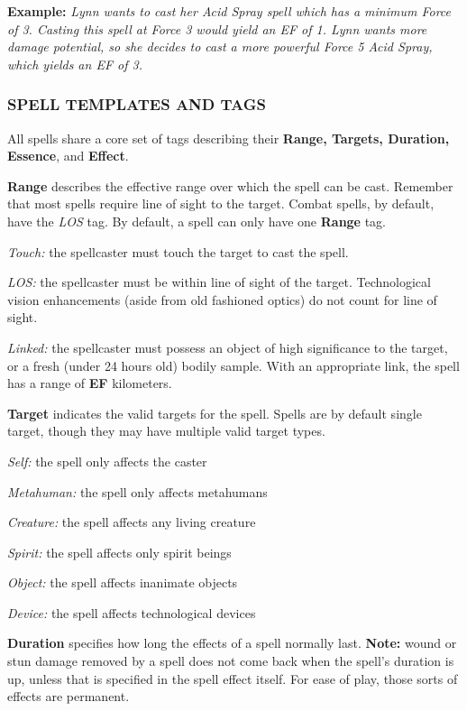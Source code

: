 \documentclass[oneside,10pt]{article}
\begin{document}
\begin{multicols}{2}
\begin{adjustwidth*}{.5cm}{.5cm}
\textbf{Example:} \textit{Lynn wants to cast her Acid Spray spell which has a minimum Force of 3. Casting this spell at Force 3 would yield an EF of 1. Lynn wants more damage potential, so she decides to cast a more powerful Force 5 Acid Spray, which yields an EF of 3.}
\end{adjustwidth*}


\subsubsection{SPELL TEMPLATES AND TAGS}

All spells share a core set of tags describing their \textbf{Range, Targets, Duration, Essence}, and \textbf{Effect}.

\textbf{Range} describes the effective range over which the spell can
be cast. Remember that most spells require line of sight to the
target. Combat spells, by default, have the \textit{LOS} tag. By default, a spell can only have one \textbf{Range} tag.
\begin{adjustwidth*}{.5cm}{.5cm}

\textit{Touch:} the spellcaster must touch the target to cast the
spell.

\textit{LOS:} the spellcaster must be within line of sight of the target. Technological vision enhancements (aside from old fashioned optics) do not count for line of sight.

\textit{Linked:} the spellcaster must possess an object of high significance to the target, or a fresh (under 24 hours old) bodily sample. With an appropriate link, the spell has a range of \textbf{EF} kilometers.

\end{adjustwidth*}
\textbf{Target} indicates the valid targets for the spell. Spells are by
default single target, though they may have multiple valid
target types.
\begin{adjustwidth*}{.5cm}{.5cm}

\textit{Self:} the spell only affects the caster

\textit{Metahuman:} the spell only affects metahumans

\textit{Creature:} the spell affects any living creature

\textit{Spirit:} the spell affects only spirit beings

\textit{Object:} the spell affects inanimate objects

\textit{Device:} the spell affects technological devices
\end{adjustwidth*}
\textbf{Duration} specifies how long the effects of a spell normally
last. \textbf{Note:} wound or stun damage removed by a spell does
not come back when the spell’s duration is up, unless that is
specified in the spell effect itself. For ease of play, those sorts
of effects are permanent.
\begin{adjustwidth*}{.5cm}{.5cm}


\end{adjustwidth*}
\end{multicols}
\end{document}
